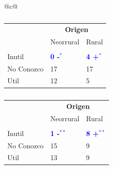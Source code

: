 \documentclass[a4paper, nobind]{templates/ociamthesis}
\begin{document}
\begin{table}
 \centering
  \begin{threeparttable}
  \caption[ASociación entre el factor Origen y PPs]{Tablas de contingencia donde el factor Origen tuvo una asosiación significativa con las PPs (a) "\textit{Aves}" y (b) "\textit{Granja}".}
\label{tab:origen-posthoc}
  \begin{tabular}{@{}c@{}} %
\begin{minipage}{\textwidth}

\begin{subtable}[b]{0.4\textwidth}


\begin{tabular}{lll}
\toprule
\multicolumn{1}{c}{\textbf{ }} & \multicolumn{2}{c}{\textbf{Origen}} \\
  & Neorrural & Rural\\
\midrule
\addlinespace[0.3em]
\multicolumn{3}{l}{\textbf{Aves}}\\
\hspace{1em}Inutil & \textcolor{blue}{\textbf{0 -$^{*}$}} & \textcolor{blue}{\textbf{4 +$^{*}$}}\\
\hspace{1em}No Conozco & 17 & 17\\
\hspace{1em}Util & 12 & 5\\
\bottomrule
\end{tabular}
  \caption{}
  \label{tab:origen-aves}
\end{subtable}
\hfill
 \begin{subtable}[b]{0.4\textwidth}

\begin{tabular}{lll}
\toprule
\multicolumn{1}{c}{\textbf{ }} & \multicolumn{2}{c}{\textbf{Origen}} \\
  & Neorrural & Rural\\
\midrule
\addlinespace[0.3em]
\multicolumn{3}{l}{\textbf{Granja}}\\
\hspace{1em}Inutil & \textcolor{blue}{\textbf{1 -$^{**}$}} & \textcolor{blue}{\textbf{8 +$^{**}$}}\\
\hspace{1em}No Conozco & 15 & 9\\
\hspace{1em}Util & 13 & 9\\
\bottomrule
\end{tabular}
    \caption{}
      \label{tab:origen-granja}
\end{subtable}
\hfill
\end{minipage}
\end{tabular} %
\end{threeparttable}


\end{table}
\end{document}
